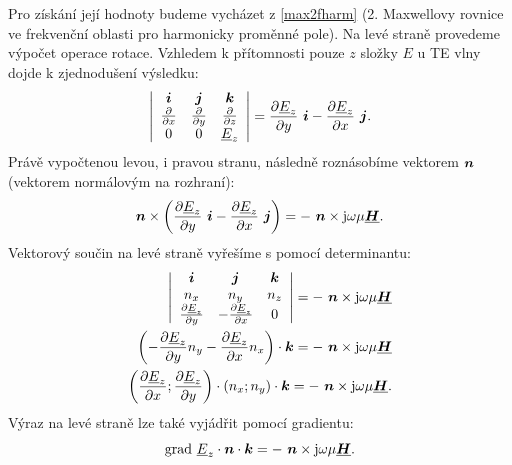 \documentclass[12pt,a4paper,oneside]{article}
\numberwithin{equation}{section} %
\numberwithin{figure}{section} %
\numberwithin{table}{section} %
\newcommand{\mj}{\mathrm{j}} %
\renewcommand{\vec}[1]{\mbox{\boldmath$#1$}} %
\newcommand{\faz}[1]{{\underline{#1}}} %
\newcommand{\grad}{\mathrm{grad}\ }
\begin{document}
Pro získání její hodnoty budeme vycházet z \ref{max2fharm} (2. Maxwellovy rovnice ve frekvenční oblasti pro harmonicky proměnné pole). Na levé straně provedeme výpočet operace rotace. Vzhledem k přítomnosti pouze $z$ složky $E$ u TE vlny dojde k zjednodušení výsledku:
\begin{equation}
\left| 
\begin{array}{c c c}
\vec{i} & \vec{j} & \vec{k} \\ 
\frac{\partial}{\partial x} & \frac{\partial}{\partial y} & \frac{\partial}{\partial z} \\
0 & 0 & \faz{E}_z
\end{array}
\right|
= \frac{\partial \faz{E}_z}{\partial y} ~ \vec{i} - \frac{\partial \faz{E}_z}{\partial x} ~ \vec{j}  .
\end{equation} 
Právě vypočtenou levou, i pravou stranu, následně roznásobíme vektorem $\vec{n}$ (vektorem normálovým na rozhraní):
\begin{equation}
\vec{n} \times \left( \frac{\partial \faz{E}_z}{\partial y} ~ \vec{i} - \frac{\partial \faz{E}_z}{\partial x} ~ \vec{j} \right) = - ~ \vec{n} \times \mj \omega \mu \faz{\vec{H}} .
\end{equation}
Vektorový součin na levé straně vyřešíme s pomocí determinantu:
\begin{subequations}
\begin{align}
\left| 
\begin{array}{c c c}
\vec{i} & \vec{j} & \vec{k} \\ 
n_x & n_y & n_z \\
\frac{\partial \faz{E}_z}{\partial y} & - \frac{\partial \faz{E}_z}{\partial x} & 0
\end{array}
\right|
= - ~ \vec{n} \times \mj \omega \mu \faz{\vec{H}} 
\\
\left( - \frac{\partial \faz{E}_z}{\partial y} n_y - \frac{\partial \faz{E}_z}{\partial x} n_x \right) \cdot \vec{k} = - ~ \vec{n} \times \mj \omega \mu \faz{\vec{H}}
\\
\left( \frac{\partial \faz{E}_z}{\partial x} ; \frac{\partial \faz{E}_z}{\partial y} \right) \cdot \left( n_x; n_y \right) \cdot \vec{k} = - ~ \vec{n} \times \mj \omega \mu \faz{\vec{H}} .
\end{align}
\end{subequations}
Výraz na levé straně lze také vyjádřit pomocí gradientu:
\begin{equation}
\grad \faz{E}_z \cdot \vec{n} \cdot \vec{k} = - ~ \vec{n} \times \mj \omega \mu \faz{\vec{H}} .
\end{equation}
\end{document}
